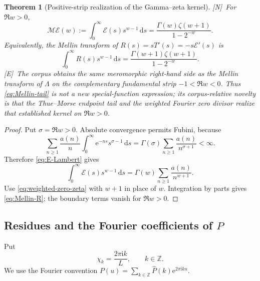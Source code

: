 \documentclass[11pt,oneside]{article}
\newtheorem{theorem}{Theorem}[section]
\theoremstyle{definition}
\theoremstyle{remark}
\newcommand{\Z}{\mathbb Z}
\newcommand{\e}{\mathrm e}
\newcommand{\ii}{\mathrm i}
\newcommand{\dd}{\,\mathrm d}
\newcommand{\Mellin}{\mathcal M}
\newcommand{\statusE}{\textsf{[E]}}
\newcommand{\statusN}{\textsf{[N]}}
\begin{document}
\begin{theorem}[Positive-strip realization of the Gamma--zeta kernel]
\label{thm:Mellin-tail}
\statusN\ For $\Re w>0$,
\begin{equation}
 \boxed{
 \Mellin\mathcal E(w):=\int_0^\infty\mathcal E(s)s^{w-1}\dd s
 =\frac{\Gamma(w)\zeta(w+1)}{1-2^{-w}}.}                   \label{eq:Mellin-tail}
\end{equation}
Equivalently, the Mellin transform of $R(s)=sT'(s)=-s\mathcal E'(s)$ is
\begin{equation}
 \int_0^\infty R(s)s^{w-1}\dd s
 =\frac{\Gamma(w+1)\zeta(w+1)}{1-2^{-w}}.                 \label{eq:Mellin-R}
\end{equation}
\statusE\ The corpus obtains the same meromorphic right-hand side as the Mellin transform
of $\Lambda$ on the complementary fundamental strip $-1<\Re w<0$.  Thus
\eqref{eq:Mellin-tail} is not a new special-function expression; its corpus-relative
novelty is that the Thue--Morse endpoint tail and the weighted Fourier zero divisor realize
that established kernel on $\Re w>0$.
\end{theorem}

\begin{proof}
Put $\sigma=\Re w>0$.  Absolute convergence permits Fubini, because
\[
 \sum_{n\ge1}\frac{a(n)}n
 \int_0^\infty\e^{-ns}s^{\sigma-1}\dd s
 =\Gamma(\sigma)\sum_{n\ge1}\frac{a(n)}{n^{\sigma+1}}<\infty.
\]
Therefore \eqref{eq:E-Lambert} gives
\[
 \int_0^\infty\mathcal E(s)s^{w-1}\dd s
 =\Gamma(w)\sum_{n\ge1}\frac{a(n)}{n^{w+1}}.
\]
Use \eqref{eq:weighted-zero-zeta} with $w+1$ in place of $w$.  Integration by parts gives
\eqref{eq:Mellin-R}; the boundary terms vanish for $\Re w>0$.
\end{proof}

\subsection{Residues and the Fourier coefficients of $P$}
Put
\begin{equation}
 \chi_k=\frac{2\pi\ii k}{L},\qquad k\in\Z.                 \label{eq:chi}
\end{equation}
We use the Fourier convention
$P(u)=\sum_{k\in\Z}\widehat P(k)\e^{2\pi\ii ku}$.
\end{document}
